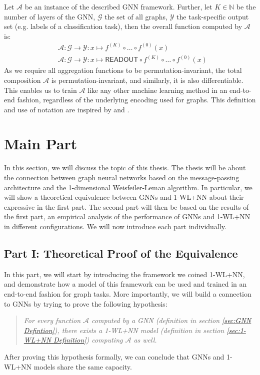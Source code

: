 \documentclass[11pt, dvipsnames, DIV=12]{scrreprt}
\theoremstyle{definition}
\begin{document}
Let $\mathcal{A}$ be an instance of the described GNN framework. Further, let $K \in \mathbb{N}$ be the number of layers of the GNN, $\mathcal{G}$ the set of all graphs, $\mathcal{Y}$ the task-specific output set (e.g. labels of a classification task), then the overall function computed by $\mathcal{A}$ is:
\begin{align}
    &\mathcal{A}: \mathcal{G} \rightarrow \mathcal{Y}: x \mapsto f^{(K)} \circ \ldots \circ f^{(0)}(x)\\
    &\mathcal{A}: \mathcal{G} \rightarrow \mathcal{Y}: x \mapsto \textsf{READOUT} \circ f^{(K)} \circ \ldots \circ f^{(0)}(x)
\end{align}
As we require all aggregation functions to be permutation-invariant, the total composition $\mathcal{A}$ is permutation-invariant, and similarly, it is also differentiable. This enables us to train $\mathcal{A}$ like any other machine learning method in an end-to-end fashion, regardless of the underlying encoding used for graphs. This definition and use of notation are inspired by \cite{Morris2018} and \cite{Xu2018}.


\section{Main Part}
In this section, we will discuss the topic of this thesis. The thesis will be about the connection between graph neural networks based on the message-passing architecture and the 1-dimensional Weisfeiler-Leman algorithm. In particular, we will show a theoretical equivalence between GNNs and 1-WL+NN about their expressive in the first part. The second part will then be based on the results of the first part, an empirical analysis of the performance of GNNs and 1-WL+NN in different configurations. We will now introduce each part individually.

\subsection{Part I: Theoretical Proof of the Equivalence}
In this part, we will start by introducing the framework we coined 1-WL+NN, and demonstrate how a model of this framework can be used and trained in an end-to-end fashion for graph tasks. More importantly, we will build a connection to GNNs by trying to prove the following hypothesis:

\begin{quote}
\textit{
    For every function $\mathcal{A}$ computed by a GNN (definition in section \ref{sec:GNN Defintion}), there exists a 1-WL+NN model (definition in section \ref{sec:1-WL+NN Definition}) computing $\mathcal{A}$ as well.
}
\end{quote}
After proving this hypothesis formally, we can conclude that GNNs and 1-WL+NN models share the same capacity.
\end{document}
